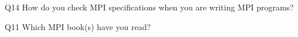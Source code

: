 \begin{description}%
\item{Q14} How do you check MPI specifications when you are writing MPI programs?%
\item{Q11} Which MPI book(s) have you read?%
\end{description}%
